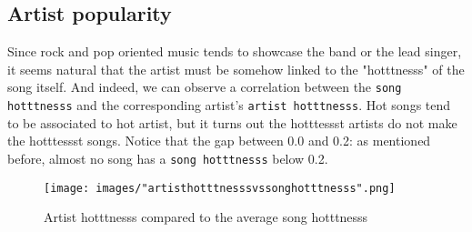 \documentclass[11pt]{article}
\renewcommand\_{\textunderscore\allowbreak}
\begin{document}


\subsection{Artist popularity}
Since rock and pop oriented music tends to showcase the band or the lead singer, it seems natural that the artist must be somehow linked to the "hotttnesss" of the song itself.
And indeed, we can observe a correlation between the \texttt{song hotttnesss} and the corresponding artist's \texttt{artist hotttnesss}.
Hot songs tend to be associated to hot artist, but it turns out the hotttessst artists do not make the hotttessst songs.
Notice that the gap between 0.0 and 0.2: as mentioned before, almost no song has a \texttt{song hotttnesss} below 0.2.

\begin{figure}[h!]
\centering
\captionsetup{width=1.0\textwidth}
\texttt{[image: images/"artist\_hotttnesss\_vs\_song\_hotttnesss".png]}
\caption{Artist hotttnesss compared to the average song hotttnesss}
\label{fig:artist_hotttnesss}
\end{figure}
\end{document}
